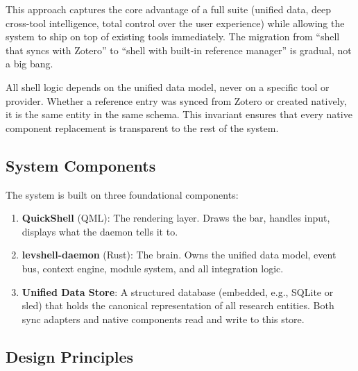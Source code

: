 \documentclass[11pt,a4paper]{article}
\begin{document}
This approach captures the core advantage of a full suite (unified data, deep cross-tool intelligence, total control over the user experience) while allowing the system to ship on top of existing tools immediately. The migration from ``shell that syncs with Zotero'' to ``shell with built-in reference manager'' is gradual, not a big bang.

\begin{designbox}
All shell logic depends on the unified data model, never on a specific tool or provider. Whether a reference entry was synced from Zotero or created natively, it is the same entity in the same schema. This invariant ensures that every native component replacement is transparent to the rest of the system.
\end{designbox}

\subsection{System Components}

The system is built on three foundational components:

\begin{enumerate}[leftmargin=1.5em, itemsep=3pt]
  \item \textbf{QuickShell} (QML): The rendering layer. Draws the bar, handles input, displays what the daemon tells it to.
  \item \textbf{levshell-daemon} (Rust): The brain. Owns the unified data model, event bus, context engine, module system, and all integration logic.
  \item \textbf{Unified Data Store}: A structured database (embedded, e.g., SQLite or sled) that holds the canonical representation of all research entities. Both sync adapters and native components read and write to this store.
\end{enumerate}

\subsection{Design Principles}
\end{document}
